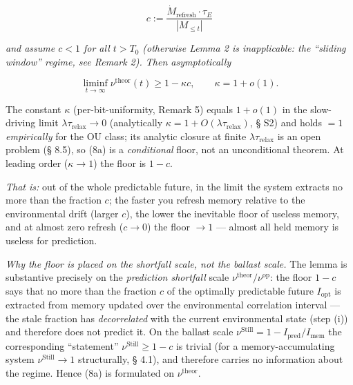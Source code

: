 \documentclass[pdflatex,sn-mathphys-ay]{sn-jnl}
\providecommand{\lt}{<}\providecommand{\gt}{>}
\begin{document}
\begin{equation}c := \frac{\dot{M}_{\text{refresh}} \cdot \tau_E}{|M_{\le t}|} \tag{*}\end{equation}



\emph{and assume \(c \lt 1\) for all \(t > T_0\) (otherwise Lemma 2 is inapplicable: the ``sliding window'' regime, see Remark 2). Then asymptotically}



\begin{equation}\liminf_{t \to \infty} \nu^{\text{theor}}(t) \ge 1 - \kappa c, \qquad \kappa = 1 + o(1). \tag{8a}\end{equation}



The constant \(\kappa\) (per-bit-uniformity, Remark 5) equals \(1 + o(1)\) in the slow-driving limit \(\lambda\tau_{\text{relax}} \to 0\) (analytically \(\kappa = 1 + O(\lambda\tau_{\text{relax}})\), § S2) and holds \(=1\) \emph{empirically} for the OU class; its analytic closure at finite \(\lambda\tau_{\text{relax}}\) is an open problem (§ 8.5), so (8a) is a \emph{conditional} floor, not an unconditional theorem. At leading order (\(\kappa \to 1\)) the floor is \(1-c\).



\emph{That is:} out of the whole predictable future, in the limit the system extracts no more than the fraction \(c\); the faster you refresh memory relative to the environmental drift (larger \(c\)), the lower the inevitable floor of useless memory, and at almost zero refresh (\(c \to 0\)) the floor \(\to 1\) --- almost all held memory is useless for prediction.



\emph{Why the floor is placed on the shortfall scale, not the ballast scale.} The lemma is substantive precisely on the \emph{prediction shortfall} scale \(\nu^{\text{theor}}/\nu^{\text{op}}\): the floor \(1-c\) says that no more than the fraction \(c\) of the optimally predictable future \(I_{\text{opt}}\) is extracted from memory updated over the environmental correlation interval --- the stale fraction has \emph{decorrelated} with the current environmental state (step (i)) and therefore does not predict it. On the ballast scale \(\nu^{\text{Still}} = 1 - I_{\text{pred}}/I_{\text{mem}}\) the corresponding ``statement'' \(\nu^{\text{Still}} \ge 1-c\) is trivial (for a memory-accumulating system \(\nu^{\text{Still}} \to 1\) structurally, § 4.1), and therefore carries no information about the regime. Hence (8a) is formulated on \(\nu^{\text{theor}}\).
\end{document}
